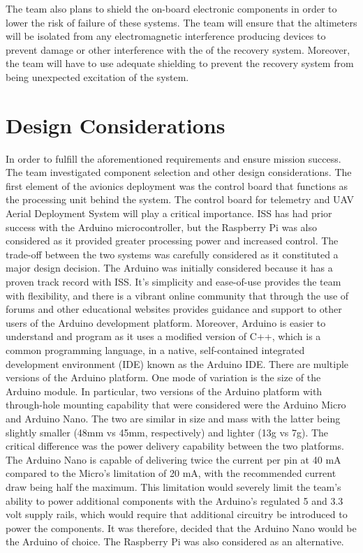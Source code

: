 The team also plans to shield the on-board electronic components in order to lower the risk of failure of these systems. The team will ensure that the altimeters will be isolated from any electromagnetic interference producing devices to prevent damage or other interference with the of the recovery system. Moreover, the team will have to use adequate shielding to prevent the recovery system from being unexpected excitation of the system.

\section{Design Considerations}

In order to fulfill the aforementioned requirements and ensure mission success. The team investigated component selection and other design considerations. The first element of the avionics deployment was the control board that functions as the processing unit behind the system.
The control board for telemetry and UAV Aerial Deployment System will play a critical importance. ISS has had prior success with the Arduino microcontroller, but the Raspberry Pi was also considered as it provided greater processing power and increased control. The trade-off between the two systems was carefully considered as it constituted a major design decision. 
	The Arduino was initially considered because it has a proven track record with ISS. It’s simplicity and ease-of-use provides the team with flexibility, and there is a vibrant online community that through the use of forums and other educational websites provides guidance and support to other users of the Arduino development platform. Moreover, Arduino is easier to understand and program as it uses a modified version of C++, which is a common programming language, in a native, self-contained integrated development environment (IDE) known as the Arduino IDE. 
	There are multiple versions of the Arduino platform. One mode of variation is the size of the Arduino module. In particular, two versions of the Arduino platform with through-hole mounting capability that were considered were the Arduino Micro and Arduino Nano. The two are similar in size and mass with the latter being slightly smaller (48mm vs 45mm, respectively) and lighter (13g vs 7g). The critical difference was the power delivery capability between the two platforms. The Arduino Nano is capable of delivering twice the current per pin at 40 mA compared to the Micro’s limitation of 20 mA, with the recommended current draw being half the maximum. This limitation would severely limit the team’s ability to power additional components with the Arduino’s regulated 5 and 3.3 volt supply rails, which would require that additional circuitry be introduced to power the components. It was therefore, decided that the Arduino Nano would be the Arduino of choice. The Raspberry Pi was also considered as an alternative. \\\\
